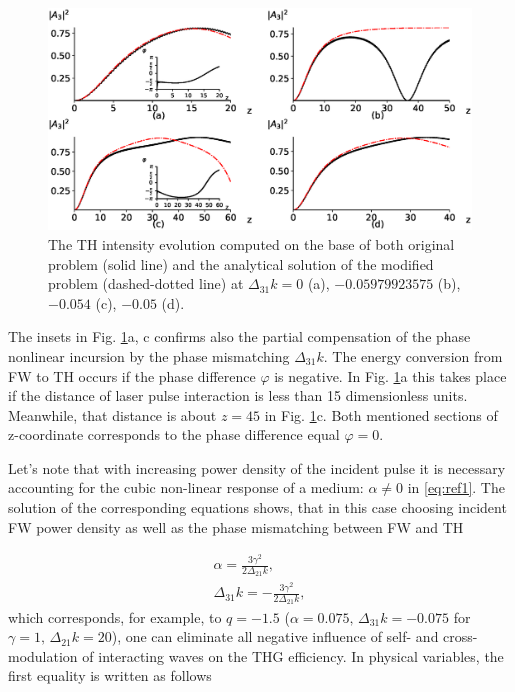 \documentclass[a4paper, 12pt, onecolumn]{extarticle}
\begin{document}
\begin{figure}[h!] 
\centering 
\includegraphics[width=0.8\linewidth]{CG_0.eps}  
\caption{ The TH intensity evolution computed on the base of both original problem (solid line) and the analytical solution of the modified problem (dashed-dotted line) at $\Delta_{31}k=0$ (a), $-0.05979923575$ (b), $-0.054$ (c), $-0.05$ (d).}
\label{fr:1}
\end{figure}

The insets in  Fig. \ref{fr:1}a, c confirms also the partial compensation of the phase nonlinear incursion by the phase mismatching $\Delta_{31}k$. The energy conversion from FW to TH occurs if the phase difference $\varphi$ is negative. In Fig. \ref{fr:1}a this takes place if the distance of laser pulse interaction is less than 15 dimensionless units. Meanwhile, that distance is about $z=45$ in Fig. \ref{fr:1}c. Both mentioned sections of z-coordinate corresponds to the phase difference equal  $\varphi=0$.

Let's note that with increasing power density of the incident pulse it is necessary accounting for the cubic non-linear response of a medium:  $\alpha \ne 0$ in \eqref{eq:ref1}.  The solution of the corresponding equations shows, that in this case choosing incident FW power density as well as the phase mismatching between FW and TH 

\begin{equation}
\label{eq:coef}
\begin{aligned}
\alpha=\frac{3\gamma^2}{2\Delta_{21}k},\\  \Delta_{31}k=-\frac{3\gamma^2}{2\Delta_{21}k},
\end{aligned}
\end{equation}
which corresponds, for example, to $q=-1.5$ ($\alpha=0.075,\,\Delta_{31}k=-0.075$ for $\gamma=1,\,\Delta_{21}k=20$), one can eliminate all negative influence of  self- and cross-modulation of interacting waves on the THG efficiency. In physical variables, the first equality is written as follows
\end{document}
